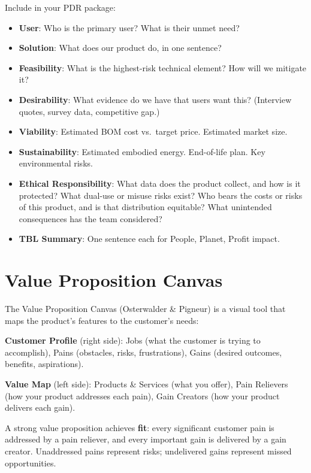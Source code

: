 \begin{greenshieldbox}
Include in your PDR package:
\begin{itemize}[nosep,leftmargin=1.5em]
\item \textbf{User}: Who is the primary user? What is their unmet need?
\item \textbf{Solution}: What does our product do, in one sentence?
\item \textbf{Feasibility}: What is the highest-risk technical element? How will we mitigate it?
\item \textbf{Desirability}: What evidence do we have that users want this? (Interview quotes, survey data, competitive gap.)
\item \textbf{Viability}: Estimated BOM cost vs.\ target price. Estimated market size.
\item \textbf{Sustainability}: Estimated embodied energy. End-of-life plan. Key environmental risks.
\item \textbf{Ethical Responsibility}: What data does the product collect, and how is it protected? What dual-use or misuse risks exist? Who bears the costs or risks of this product, and is that distribution equitable? What unintended consequences has the team considered?
\item \textbf{TBL Summary}: One sentence each for People, Planet, Profit impact.
\end{itemize}
\end{greenshieldbox}

\section{Value Proposition Canvas}
The Value Proposition Canvas (Osterwalder \& Pigneur) is a visual tool that maps the product's features to the customer's needs:

\textbf{Customer Profile} (right side): Jobs (what the customer is trying to accomplish), Pains (obstacles, risks, frustrations), Gains (desired outcomes, benefits, aspirations).

\textbf{Value Map} (left side): Products \& Services (what you offer), Pain Relievers (how your product addresses each pain), Gain Creators (how your product delivers each gain).

A strong value proposition achieves \textbf{fit}: every significant customer pain is addressed by a pain reliever, and every important gain is delivered by a gain creator. Unaddressed pains represent risks; undelivered gains represent missed opportunities.

